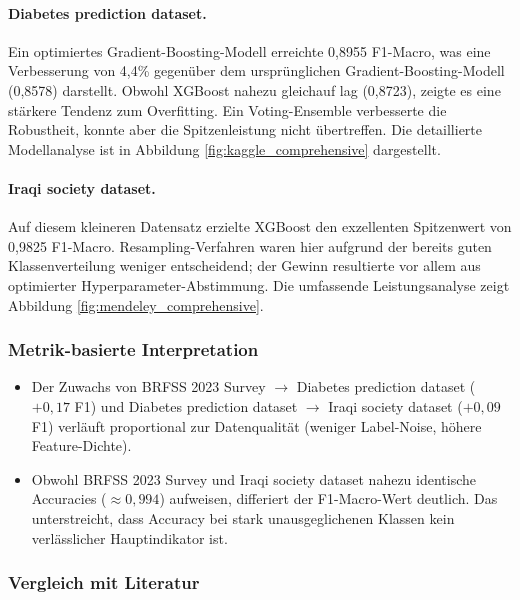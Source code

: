 \documentclass[10pt]{scrartcl}
\begin{document}
\paragraph{Diabetes prediction dataset.}
Ein optimiertes Gradient-Boosting-Modell erreichte 0,8955 F1-Macro, was eine Verbesserung von 4,4\% gegenüber dem ursprünglichen Gradient-Boosting-Modell (0,8578) darstellt. Obwohl XGBoost nahezu gleichauf lag (0,8723), zeigte es eine stärkere Tendenz zum Overfitting. Ein Voting-Ensemble verbesserte die Robustheit, konnte aber die Spitzenleistung nicht übertreffen. Die detaillierte Modellanalyse ist in Abbildung \ref{fig:kaggle_comprehensive} dargestellt.

\paragraph{Iraqi society dataset.}
Auf diesem kleineren Datensatz erzielte XGBoost den exzellenten Spitzenwert von 0,9825 F1-Macro. Resampling-Verfahren waren hier aufgrund der bereits guten Klassenverteilung weniger entscheidend; der Gewinn resultierte vor allem aus optimierter Hyperparameter-Abstimmung. Die umfassende Leistungsanalyse zeigt Abbildung \ref{fig:mendeley_comprehensive}.

\subsubsection{Metrik-basierte Interpretation}

\begin{itemize}
  \item Der Zuwachs von BRFSS 2023 Survey \(\rightarrow\) Diabetes prediction dataset (\(+0{,}17\) F1) und Diabetes prediction dataset \(\rightarrow\) Iraqi society dataset (\(+0{,}09\) F1) verläuft proportional zur Datenqualität (weniger Label-Noise, höhere Feature-Dichte).
  \item Obwohl BRFSS 2023 Survey und Iraqi society dataset nahezu identische Accuracies (\(\approx 0{,}994\)) aufweisen, differiert der F1-Macro-Wert deutlich. Das unterstreicht, dass Accuracy bei stark unausgeglichenen Klassen kein verlässlicher Hauptindikator ist.
\end{itemize}

\subsubsection{Vergleich mit Literatur}
\end{document}

